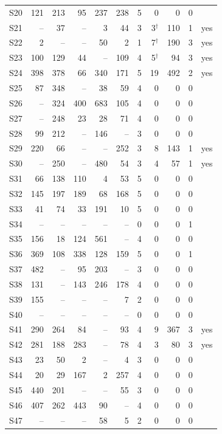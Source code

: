 {\begin{footnotesize}
\begin{longtable}{lrrrrrrrrrl}
S20 & 121 & 213 & 95 & 237 & 238 & 5 & 0 & 0 & 0 &  \\
S21 & -- & 37 & -- & 3 & 44 & 3 & 3$^\dagger$ & 110 & 1 & yes \\
S22 & 2 & -- & -- & 50 & 2 & 1 & 7$^\dagger$ & 190 & 3 & yes \\
S23 & 100 & 129 & 44 & -- & 109 & 4 & 5$^\dagger$ & 94 & 3 & yes \\
S24 & 398 & 378 & 66 & 340 & 171 & 5 & 19 & 492 & 2 & yes \\
S25 & 87 & 348 & -- & 38 & 59 & 4 & 0 & 0 & 0 &  \\
S26 & -- & 324 & 400 & 683 & 105 & 4 & 0 & 0 & 0 &  \\
S27 & -- & 248 & 23 & 28 & 71 & 4 & 0 & 0 & 0 &  \\
S28 & 99 & 212 & -- & 146 & -- & 3 & 0 & 0 & 0 &  \\
S29 & 220 & 66 & -- & -- & 252 & 3 & 8 & 143 & 1 & yes \\
S30 & -- & 250 & -- & 480 & 54 & 3 & 4 & 57 & 1 & yes \\
S31 & 66 & 138 & 110 & 4 & 53 & 5 & 0 & 0 & 0 &  \\
S32 & 145 & 197 & 189 & 68 & 168 & 5 & 0 & 0 & 0 &  \\
S33 & 41 & 74 & 33 & 191 & 10 & 5 & 0 & 0 & 0 &  \\
S34 & -- & -- & -- & -- & -- & 0 & 0 & 0 & 1 &  \\
S35 & 156 & 18 & 124 & 561 & -- & 4 & 0 & 0 & 0 &  \\
S36 & 369 & 108 & 338 & 128 & 159 & 5 & 0 & 0 & 1 &  \\
S37 & 482 & -- & 95 & 203 & -- & 3 & 0 & 0 & 0 &  \\
S38 & 131 & -- & 143 & 246 & 178 & 4 & 0 & 0 & 0 &  \\
S39 & 155 & -- & -- & -- & 7 & 2 & 0 & 0 & 0 &  \\
S40 & -- & -- & -- & -- & -- & 0 & 0 & 0 & 0 &  \\
S41 & 290 & 264 & 84 & -- & 93 & 4 & 9 & 367 & 3 & yes \\
S42 & 281 & 188 & 283 & -- & 78 & 4 & 3 & 80 & 3 & yes \\
S43 & 23 & 50 & 2 & -- & 4 & 3 & 0 & 0 & 0 &  \\
S44 & 20 & 29 & 167 & 2 & 257 & 4 & 0 & 0 & 0 &  \\
S45 & 440 & 201 & -- & -- & 55 & 3 & 0 & 0 & 0 &  \\
S46 & 407 & 262 & 443 & 90 & -- & 4 & 0 & 0 & 0 &  \\
S47 & -- & -- & -- & 58 & 5 & 2 & 0 & 0 & 0 &  \\

\end{longtable}
\end{footnotesize}}
